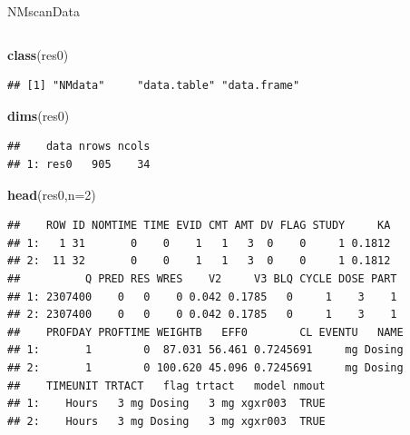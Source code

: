 \documentclass[
  8pt,
  ignorenonframetext,
  aspectratio=169]{beamer}
\newenvironment{Shaded}{\begin{snugshade}}{\end{snugshade}}
\newcommand{\DataTypeTok}[1]{\textcolor[rgb]{0.13,0.29,0.53}{#1}}
\newcommand{\DecValTok}[1]{\textcolor[rgb]{0.00,0.00,0.81}{#1}}
\newcommand{\KeywordTok}[1]{\textcolor[rgb]{0.13,0.29,0.53}{\textbf{#1}}}
\newcommand{\NormalTok}[1]{#1}
\begin{document}
\begin{frame}[fragile]{NMscanData}
\begin{columns}[T]
\pause

\begin{column}{0.48\textwidth}
\begin{Shaded}
\begin{Highlighting}[]
\KeywordTok{class}\NormalTok{(res0)}
\end{Highlighting}
\end{Shaded}

\begin{verbatim}
## [1] "NMdata"     "data.table" "data.frame"
\end{verbatim}

\begin{Shaded}
\begin{Highlighting}[]
\KeywordTok{dims}\NormalTok{(res0)}
\end{Highlighting}
\end{Shaded}

\begin{verbatim}
##    data nrows ncols
## 1: res0   905    34
\end{verbatim}

\begin{Shaded}
\begin{Highlighting}[]
\KeywordTok{head}\NormalTok{(res0,}\DataTypeTok{n=}\DecValTok{2}\NormalTok{)}
\end{Highlighting}
\end{Shaded}

\begin{verbatim}
##    ROW ID NOMTIME TIME EVID CMT AMT DV FLAG STUDY     KA
## 1:   1 31       0    0    1   1   3  0    0     1 0.1812
## 2:  11 32       0    0    1   1   3  0    0     1 0.1812
##          Q PRED RES WRES    V2     V3 BLQ CYCLE DOSE PART
## 1: 2307400    0   0    0 0.042 0.1785   0     1    3    1
## 2: 2307400    0   0    0 0.042 0.1785   0     1    3    1
##    PROFDAY PROFTIME WEIGHTB   EFF0        CL EVENTU   NAME
## 1:       1        0  87.031 56.461 0.7245691     mg Dosing
## 2:       1        0 100.620 45.096 0.7245691     mg Dosing
##    TIMEUNIT TRTACT   flag trtact   model nmout
## 1:    Hours   3 mg Dosing   3 mg xgxr003  TRUE
## 2:    Hours   3 mg Dosing   3 mg xgxr003  TRUE
\end{verbatim}

\normalsize
\end{column}
\end{columns}
\end{frame}
\end{document}
